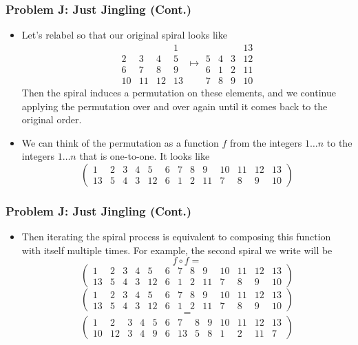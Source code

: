 \begin{frame}
  \frametitle{Problem J: Just Jingling (Cont.)}
  \begin{itemize}
    \item Let's relabel so that our original spiral looks like
      \[
      \begin{array}{cccc}
          &    &   & 1\\
        2 & 3  & 4 & 5\\
        6 & 7 & 8 & 9\\
        10 & 11 & 12 & 13
      \end{array}\mapsto
      \begin{array}{cccc}
            &    &   & 13\\
          5 & 4  & 3 & 12\\
          6 & 1 & 2 & 11\\
          7 & 8 & 9 & 10
        \end{array}
      \]
      Then the spiral induces a permutation on these elements, and we continue applying the permutation over
      and over again until it comes back to the original order.
    \item We can think of the permutation as a function $f$ from the integers $1\dots n$ to the
        integers $1\dots n$ that is one-to-one. It looks like
      \[ 
        \begin{pmatrix} 1 & 2 & 3 & 4 & 5 & 6 & 7 & 8 & 9 & 10 & 11 & 12 & 13\\
        13 & 5 & 4 & 3 & 12 & 6 & 1 & 2 & 11 & 7 & 8 & 9 & 10 \end{pmatrix}
      \]
  \end{itemize}
\end{frame}

\begin{frame}
  \frametitle{Problem J: Just Jingling (Cont.)}
  \begin{itemize}
    \item Then iterating the spiral process is equivalent to composing this function with itself multiple times.
      For example, the second spiral we write will be 
      \[ f\circ f = \]
      \[
      \begin{pmatrix} 1 & 2 & 3 & 4 & 5 & 6 & 7 & 8 & 9 & 10 & 11 & 12 & 13\\
      13 & 5 & 4 & 3 & 12 & 6 & 1 & 2 & 11 & 7 & 8 & 9 & 10 \end{pmatrix}
      \]
      \[
      \begin{pmatrix} 1 & 2 & 3 & 4 & 5 & 6 & 7 & 8 & 9 & 10 & 11 & 12 & 13\\
      13 & 5 & 4 & 3 & 12 & 6 & 1 & 2 & 11 & 7 & 8 & 9 & 10 \end{pmatrix}
    \]
      \[
      =
    \]
    \[
      \begin{pmatrix} 1 & 2 & 3 & 4 & 5 & 6 & 7 & 8 & 9 & 10 & 11 & 12 & 13\\
      10 & 12 & 3 & 4 & 9 & 6 & 13 & 5 & 8 & 1 & 2 & 11 & 7 \end{pmatrix}
    \]
  \end{itemize}
\end{frame}

